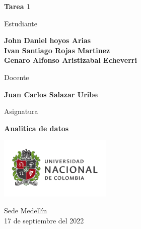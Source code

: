 \begin{titlepage}
   \Large{
   \begin{center}
       \vspace*{1cm}

       \textbf{Tarea 1}

            
       \vspace{1.1cm}
       
       Estudiante
       
       \vspace{0.5cm}
        

       \textbf{John Daniel hoyos Arias} \\

       \textbf{Ivan Santiago Rojas Martinez} \\
       
       \textbf{Genaro Alfonso Aristizabal Echeverri}




       \vspace{1cm}
       
       Docente
       
       \vspace{0.5cm}

       \textbf{Juan Carlos Salazar Uribe}
       
       \vspace{0.4cm}

       \vspace{1.4cm}
       
       Asignatura
       
       \vspace{0.5cm}

       \textbf{Analitica de datos}

       \vfill

            
       \vspace{0.4cm}
     
       \includegraphics[width=0.4\textwidth]{DocumentFormat/logounal.png}
            
       Sede Medellín\\
       17 de septiembre del 2022
       
   \end{center}
   }
\end{titlepage}